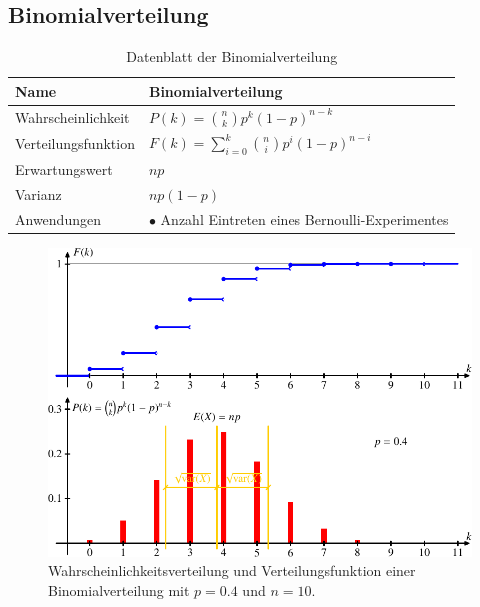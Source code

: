%
%
%
\subsection{Binomialverteilung\label{section-binomialverteilung}}
\begin{table}
\renewcommand{\arraystretch}{1.5}
\begin{center}
\begin{tabular}{|l|l|}
\hline
Name&Binomialverteilung\\
\hline
Wahrscheinlichkeit&
\begin{minipage}{3.7in}
\vskip3pt
$\displaystyle P(k)=\binom{n}{k}p^k(1-p)^{n-k}$
\end{minipage}
\\[10pt]
Verteilungsfunktion&
$\displaystyle F(k)=\sum_{i=0}^k\binom{n}{i}p^i(1-p)^{n-i}$
\\[10pt]
Erwartungswert&$\displaystyle np$\\
Varianz&$\displaystyle np(1-p)$\\
\hline
Anwendungen&\begin{minipage}{3.7in}%
\strut
$\bullet$ Anzahl Eintreten eines Bernoulli-Experimentes
\strut
\end{minipage}\\
\hline
\end{tabular}
\end{center}
\caption{Datenblatt der Binomialverteilung\label{datenblatt:binomialverteilung}}
\end{table}
\begin{figure}
\centering
\includegraphics{images/gl-3.pdf}
\caption{Wahrscheinlichkeitsverteilung und Verteilungsfunktion einer
Binomialverteilung mit $p=0.4$ und $n=10$.
\label{binomialgraph}}
\end{figure}

